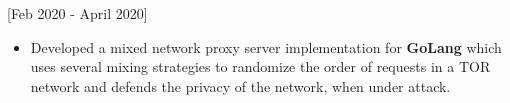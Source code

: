 \documentclass{article}
\begin{document}
 [\normalfont{}Feb 2020 - April 2020]
\begin{itemize}
    \item Developed a mixed network proxy server implementation for \textbf{GoLang} which uses several mixing strategies 
    to randomize the order of requests in a TOR network and defends the privacy of the network, when under attack.
\end{itemize} 
\end{document}
